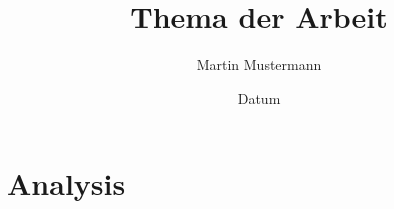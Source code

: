 %
% 
% 
%




\newcommand*\rot{\rotatebox{90}}



\title{Thema der Arbeit}
\author{Martin Mustermann}
\date{Datum}


\tableofcontents %

\chapter{Analysis}
